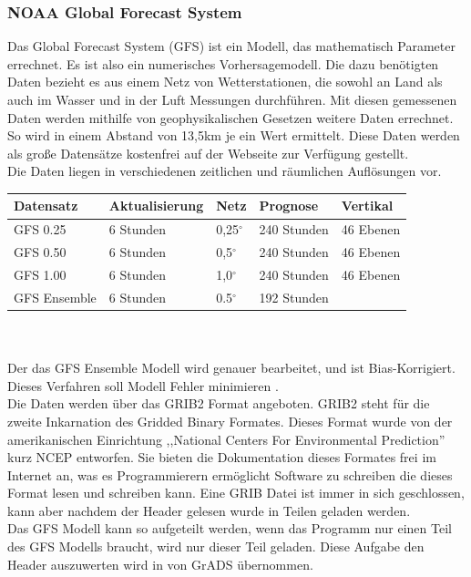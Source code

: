 \subsubsection*{NOAA Global Forecast System} %
Das Global Forecast System (GFS) ist ein Modell, das mathematisch Parameter errechnet.
Es ist also ein numerisches Vorhersagemodell.
Die dazu benötigten Daten bezieht es aus einem Netz von Wetterstationen,
die sowohl an Land als auch im Wasser und in der Luft Messungen durchführen.
Mit diesen gemessenen Daten werden mithilfe von geophysikalischen Gesetzen weitere Daten errechnet.
So wird in einem Abstand von 13,5km je ein Wert ermittelt.
Diese Daten werden als große Datensätze kostenfrei auf
der Webseite  \cite{ncep} zur Verfügung gestellt.\\
Die Daten liegen in verschiedenen zeitlichen und räumlichen Auflösungen vor.
\newpage
\begin{tabular}{|l|l|l|l|l|}
	\hline
	Datensatz & Aktualisierung & Netz & Prognose & Vertikal\\
	\hline
	GFS 0.25 & 6 Stunden & 0,25$^{\circ}$ & 240 Stunden & 46 Ebenen\\
	\hline
	GFS 0.50 & 6 Stunden & 0,5$^{\circ}$ & 240 Stunden & 46 Ebenen\\
	\hline
	GFS 1.00 & 6 Stunden & 1,0$^{\circ}$ & 240 Stunden & 46 Ebenen\\
	\hline
	GFS Ensemble & 6 Stunden & 0.5$^{\circ}$ & 192 Stunden & \\
	\hline
\end{tabular}
\\
\\
Der das GFS Ensemble Modell wird genauer bearbeitet, und ist Bias-Korrigiert.
Dieses Verfahren soll Modell Fehler minimieren \cite{gfshdens}. \\
Die Daten werden über das GRIB2 Format angeboten. GRIB2 steht für die zweite Inkarnation
des Gridded Binary Formates. Dieses Format wurde
von der amerikanischen Einrichtung ,,National Centers For Environmental Prediction''
kurz NCEP entworfen. Sie bieten die Dokumentation dieses Formates frei im Internet
an, was es Programmierern ermöglicht Software zu schreiben die dieses Format lesen und
schreiben kann. Eine GRIB Datei ist immer in sich geschlossen, kann aber nachdem der
Header gelesen wurde in Teilen geladen werden.\\
Das GFS Modell kann so aufgeteilt werden, wenn das Programm nur einen Teil des GFS
Modells braucht, wird nur dieser Teil geladen. Diese Aufgabe den Header auszuwerten
wird in \vs von GrADS übernommen.

